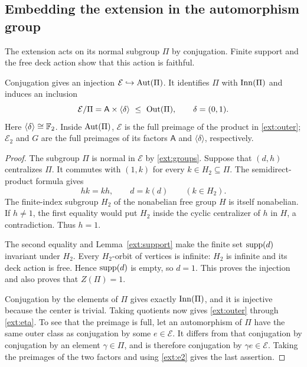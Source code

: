 \subsection{Embedding the extension in the automorphism group}

The extension acts on its normal subgroup $\Pi$ by conjugation.
Finite support and the free deck action show that this action
is faithful.

\begin{proposition}\label{ext:embedding}
Conjugation gives an injection
$\mathcal E\hookrightarrow\operatorname{Aut}(\Pi)$.  It identifies $\Pi$ with
$\operatorname{Inn}(\Pi)$ and induces an inclusion
\begin{equation}\label{ext:outer}
 \mathcal E/\Pi
   =\mathsf A\times\langle\delta\rangle
   \ \leq\ \operatorname{Out}(\Pi),
 \qquad \delta=(0,1).
\end{equation}
Here $\langle\delta\rangle\cong\mathbb F_2$.  Inside $\operatorname{Aut}(\Pi)$,
$\mathcal E$ is the full preimage of the product in
\eqref{ext:outer}; $\mathcal E_2$ and $G$ are the full preimages of
its factors $\mathsf A$ and $\langle\delta\rangle$, respectively.
\end{proposition}

\begin{proof}
The subgroup $\Pi$ is normal in $\mathcal E$ by
\eqref{ext:groups}.  Suppose that $(d,h)$ centralizes $\Pi$.
It commutes with $(1,k)$ for every $k\in H_2\subseteq\Pi$.
The semidirect-product formula gives
\[
 hk=kh,\qquad d=k(d)\qquad(k\in H_2).
\]
The finite-index subgroup $H_2$ of the nonabelian free group $H$
is itself nonabelian.  If $h\ne1$, the first equality would put
$H_2$ inside the cyclic centralizer of $h$ in $H$, a
contradiction.  Thus $h=1$.

The second equality and Lemma~\ref{ext:support} make the finite
set $\operatorname{supp}(d)$ invariant under $H_2$.  Every $H_2$-orbit of
vertices is infinite: $H_2$ is infinite and its deck action is
free.  Hence $\operatorname{supp}(d)$ is empty, so $d=1$.  This proves the
injection and also proves that $Z(\Pi)=1$.

Conjugation by the elements of $\Pi$ gives exactly
$\operatorname{Inn}(\Pi)$, and it is injective because the center is trivial.
Taking quotients now gives \eqref{ext:outer} through
\eqref{ext:eta}.  To see that the preimage is full, let an
automorphism of $\Pi$ have the same outer class as conjugation
by some $e\in\mathcal E$.  It differs from that conjugation by
conjugation by an element $\gamma\in\Pi$, and is therefore
conjugation by $\gamma e\in\mathcal E$.  Taking the preimages of
the two factors and using \eqref{ext:e2} gives the last
assertion.
\end{proof}

